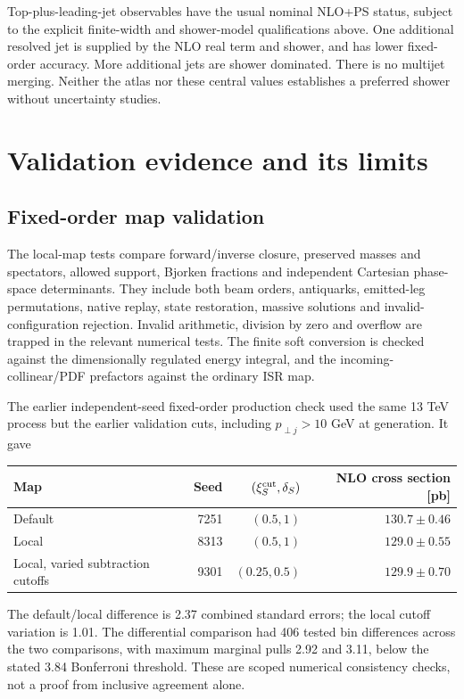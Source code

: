 \documentclass[11pt,a4paper]{article}
\begin{document}
Top-plus-leading-jet observables have the usual nominal NLO+PS status,
subject to the explicit finite-width and shower-model qualifications above.
One additional resolved jet is supplied by the NLO real term and shower,
and has lower fixed-order accuracy. More additional jets are shower
dominated. There is no multijet merging. Neither the atlas nor these
central values establishes a preferred shower without uncertainty studies.

\section{Validation evidence and its limits}\label{sec:validation}

\subsection{Fixed-order map validation}

The local-map tests compare forward/inverse closure, preserved masses and
spectators, allowed support, Bjorken fractions and independent Cartesian
phase-space determinants. They include both beam orders, antiquarks,
emitted-leg permutations, native replay, state restoration, massive
solutions and invalid-configuration rejection. Invalid arithmetic,
division by zero and overflow are trapped in the relevant numerical tests.
The finite soft conversion is checked against the dimensionally regulated
energy integral, and the incoming-collinear/PDF prefactors against the
ordinary ISR map.

The earlier independent-seed fixed-order production check used the same
13 TeV process but the earlier validation cuts, including $p_{\perp j}>10$
GeV at generation. It gave
\begin{center}
\begin{tabular}{@{}lrrr@{}}
\toprule
Map & Seed & $(\xi_S^{\rm cut},\delta_S)$ & NLO cross section [pb]\\
\midrule
Default & 7251 & $(0.5,1)$ & $130.7\pm0.46$\\
Local & 8313 & $(0.5,1)$ & $129.0\pm0.55$\\
Local, varied subtraction cutoffs & 9301 & $(0.25,0.5)$ & $129.9\pm0.70$\\
\bottomrule
\end{tabular}
\end{center}
The default/local difference is 2.37 combined standard errors; the local
cutoff variation is 1.01. The differential comparison had 406 tested bin
differences across the two comparisons, with maximum marginal pulls 2.92
and 3.11, below the stated 3.84 Bonferroni threshold. These are scoped
numerical consistency checks, not a proof from inclusive agreement alone.
\end{document}
